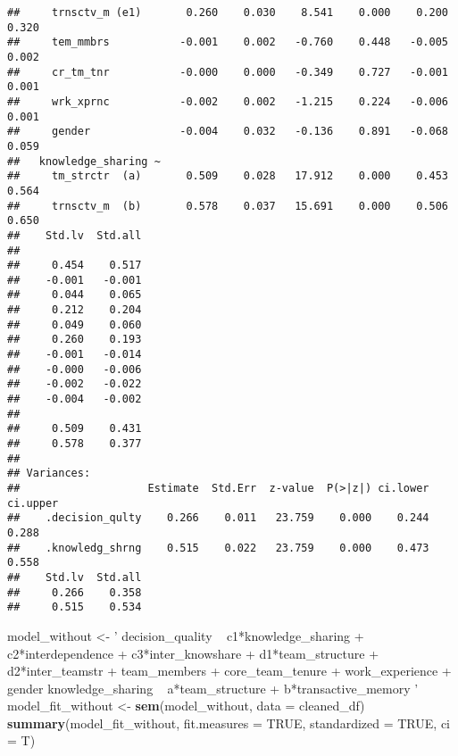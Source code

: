 \documentclass[]{article}
\newenvironment{Shaded}{\begin{snugshade}}{\end{snugshade}}
\newcommand{\DataTypeTok}[1]{\textcolor[rgb]{0.13,0.29,0.53}{#1}}
\newcommand{\KeywordTok}[1]{\textcolor[rgb]{0.13,0.29,0.53}{\textbf{#1}}}
\newcommand{\NormalTok}[1]{#1}
\newcommand{\OtherTok}[1]{\textcolor[rgb]{0.56,0.35,0.01}{#1}}
\newcommand{\StringTok}[1]{\textcolor[rgb]{0.31,0.60,0.02}{#1}}
\begin{document}
\begin{verbatim}
##     trnsctv_m (e1)       0.260    0.030    8.541    0.000    0.200    0.320
##     tem_mmbrs           -0.001    0.002   -0.760    0.448   -0.005    0.002
##     cr_tm_tnr           -0.000    0.000   -0.349    0.727   -0.001    0.001
##     wrk_xprnc           -0.002    0.002   -1.215    0.224   -0.006    0.001
##     gender              -0.004    0.032   -0.136    0.891   -0.068    0.059
##   knowledge_sharing ~                                                      
##     tm_strctr  (a)       0.509    0.028   17.912    0.000    0.453    0.564
##     trnsctv_m  (b)       0.578    0.037   15.691    0.000    0.506    0.650
##    Std.lv  Std.all
##                   
##     0.454    0.517
##    -0.001   -0.001
##     0.044    0.065
##     0.212    0.204
##     0.049    0.060
##     0.260    0.193
##    -0.001   -0.014
##    -0.000   -0.006
##    -0.002   -0.022
##    -0.004   -0.002
##                   
##     0.509    0.431
##     0.578    0.377
## 
## Variances:
##                    Estimate  Std.Err  z-value  P(>|z|) ci.lower ci.upper
##    .decision_qulty    0.266    0.011   23.759    0.000    0.244    0.288
##    .knowledg_shrng    0.515    0.022   23.759    0.000    0.473    0.558
##    Std.lv  Std.all
##     0.266    0.358
##     0.515    0.534
\end{verbatim}

\begin{Shaded}
\begin{Highlighting}[]
\NormalTok{model_without <-}\StringTok{ '}
\StringTok{decision_quality ~ c1*knowledge_sharing + c2*interdependence + c3*inter_knowshare + d1*team_structure + d2*inter_teamstr + team_members + core_team_tenure + work_experience + gender}
\StringTok{knowledge_sharing ~ a*team_structure + b*transactive_memory}
\StringTok{'}
\NormalTok{model_fit_without <-}\StringTok{ }\KeywordTok{sem}\NormalTok{(model_without, }\DataTypeTok{data =}\NormalTok{ cleaned_df)}
\KeywordTok{summary}\NormalTok{(model_fit_without, }\DataTypeTok{fit.measures =} \OtherTok{TRUE}\NormalTok{, }\DataTypeTok{standardized =} \OtherTok{TRUE}\NormalTok{, }\DataTypeTok{ci =}\NormalTok{ T)}
\end{Highlighting}
\end{Shaded}
\end{document}
